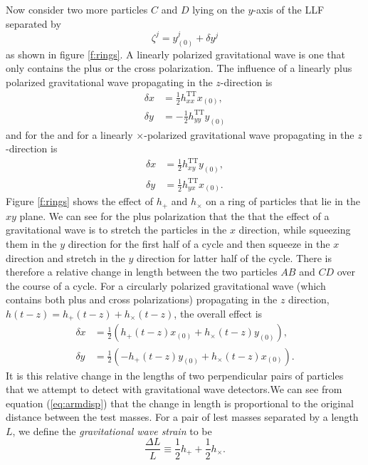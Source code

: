 Now consider two more particles $C$ and $D$ lying on the $y$-axis of the LLF
separated by 
\begin{equation}
\zeta^j = y^j_{(0)} + \delta y^j
\end{equation}
as shown in figure \ref{f:rings}. A linearly polarized gravitational wave is
one that only contains the plus or the cross polarization. The influence of
a linearly plus polarized gravitational wave propagating in the $z$-direction
is
\begin{align}
\delta x &= \frac{1}{2} h_{xx}^\mathrm{TT} x_{(0)},\\
\delta y &= -\frac{1}{2} h_{yy}^\mathrm{TT} y_{(0)}
\end{align}
and for the and for a linearly $\times$-polarized gravitational wave
propagating in the $z$-direction is
\begin{align}
\delta x &= \frac{1}{2} h_{xy}^\mathrm{TT} y_{(0)},\\
\delta y &= \frac{1}{2} h_{yx}^\mathrm{TT} x_{(0)}.
\end{align}
Figure \ref{f:rings} shows the effect of $h_{+}$ and $h_{\times}$ on a ring
of particles that lie in the $xy$ plane. We can see for the plus polarization
that the that the effect of a gravitational wave is to stretch the particles
in the $x$ direction, while squeezing them in the $y$ direction for the first
half of a cycle and then squeeze in the $x$ direction and stretch in the $y$
direction for latter half of the cycle.  There is therefore a relative change
in length between the two particles $AB$ and $CD$ over the course of a cycle.
For a circularly polarized gravitational wave (which contains both plus and
cross polarizations) propagating in the $z$ direction, $h(t-z) =
h_{+}(t-z) + h_{\times}(t-z)$, the overall effect is
\begin{align}
\delta x &= \frac{1}{2}\left(h_{+}(t-z) x_{(0)} + h_{\times}(t-z) y_{(0)}\right),\\
\delta y &= \frac{1}{2}\left(-h_{+}(t-z) y_{(0)} + h_{\times}(t-z) x_{(0)}\right).
\label{eq:armdisp}
\end{align}
It is this relative change in the lengths of two perpendicular pairs of
particles that we attempt to detect with gravitational wave detectors.We can
see from equation (\ref{eq:armdisp}) that the change in length is proportional
to the original distance between the test masses. For a pair of lest masses
separated by a length $L$, we define the \emph{gravitational wave strain} to
be
\begin{equation}
\frac{\Delta L}{L} \equiv \frac{1}{2} h_{+} + \frac{1}{2} h_{\times}.
\end{equation}

